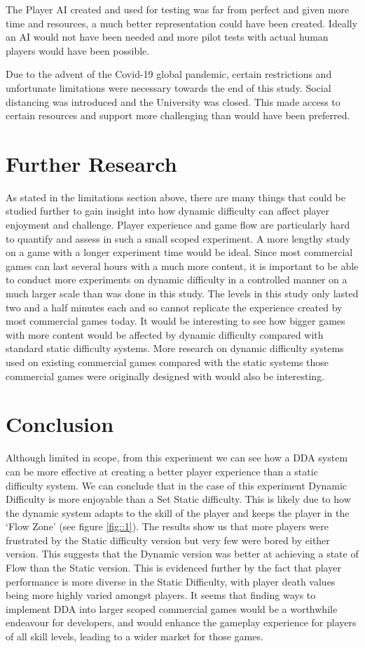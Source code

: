 \documentclass[journal]{IEEEtran}
\begin{document}
The Player AI created and used for testing was far from perfect and given more time and resources, a much better representation could have been created. Ideally an AI would not have been needed and more pilot tests with actual human players would have been possible.

Due to the advent of the Covid-19 global pandemic, certain restrictions and unfortunate limitations were necessary towards the end of this study. Social distancing was introduced and the University was closed. This made access to certain resources and support more challenging than would have been preferred.

\section{Further Research}
As stated in the limitations section above, there are many things that could be studied further to gain insight into how dynamic difficulty can affect player enjoyment and challenge. Player experience and game flow are particularly hard to quantify and assess in such a small scoped experiment. A more lengthy study on a game with a longer experiment time would be ideal. Since most commercial games can last several hours with a much more content, it is important to be able to conduct more experiments on dynamic difficulty in a controlled manner on a much larger scale than was done in this study. The levels in this study only lasted two and a half minutes each and so cannot replicate the experience created by most commercial games today. It would be interesting to see how bigger games with more content would be affected by dynamic difficulty compared with standard static difficulty systems. More research on dynamic difficulty systems used on existing commercial games compared with the static systems those commercial games were originally designed with would also be interesting.

\section{Conclusion}
Although limited in scope, from this experiment we can see how a DDA system can be more effective at creating a better player experience than a static difficulty system.  We can conclude that in the case of this experiment Dynamic Difficulty is more enjoyable than a Set Static difficulty. This is likely due to how the dynamic system adapts to the skill of the player and keeps the player in the `Flow Zone' (see figure \ref{fig::1}). The results show us that more players were frustrated by the Static difficulty version but very few were bored by either version. This suggests that the Dynamic version was better at achieving a state of Flow than the Static version. This is evidenced further by the fact that player performance is more diverse in the Static Difficulty, with player death values being more highly varied amongst players. It seems that finding ways to implement DDA into larger scoped commercial games would be a worthwhile endeavour for developers, and would enhance the gameplay experience for players of all skill levels, leading to a wider market for those games.
\end{document}
